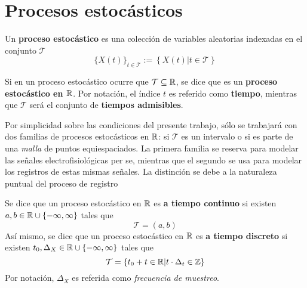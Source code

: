 
\section{Procesos estocásticos}

\begin{definicion}
Un \textbf{proceso estocástico} \xt es una colección de variables aleatorias indexadas en el 
conjunto $\mathcal{T}$
\begin{equation}
\{X(t)\}_{t\in \mathcal{T}} := \left\{ X(t) \lvert t\in \mathcal{T} \right\}
\end{equation}
\end{definicion}

\begin{definicion}
Si en un proceso estocástico \xt ocurre que $\mathcal{T} \subseteq \mathbb{R}$, se dice que es un \textbf{proceso estocástico en $\mathbb{R}$}.
%
Por notación, el índice $t$ es referido como \textbf{tiempo}, mientras que $\mathcal{T}$ será el conjunto de \textbf{tiempos admisibles}.
\end{definicion}

Por simplicidad sobre las condiciones del presente trabajo, sólo se trabajará con dos familias de procesos estocásticos en $\mathbb{R}$: si $\mathcal{T}$ es un intervalo o si es parte de una \textit{malla} de puntos equiespaciados. 
%
La primera familia se reserva para modelar las señales electrofisiológicas per se, mientras que el segundo se usa para modelar los registros de estas mismas señales.
%
La distinción se debe a la naturaleza puntual del proceso de registro

\begin{definicion}
Se dice que un proceso estocástico en $\mathbb{R}$ es \textbf{a tiempo continuo} si existen $a, b \in \mathbb{R} \cup \{ -\infty, \infty \}$ tales que
\begin{equation}
\mathcal{T} = (a,b)
\end{equation}
Así mismo, se dice que un proceso estocástico en $\mathbb{R}$ es \textbf{a tiempo discreto} si existen $t_0, \Delta_X \in \mathbb{R} \cup \{ -\infty, \infty \}$ tales que
\begin{equation}
\mathcal{T} = \left\{ t_0 + t \in \mathbb{R} | {t} \cdot {\Delta_t} \in \mathbb{Z} \right\}
\end{equation}
Por notación, $\Delta_X$ es referida como \textit{frecuencia de muestreo}.
\end{definicion}


